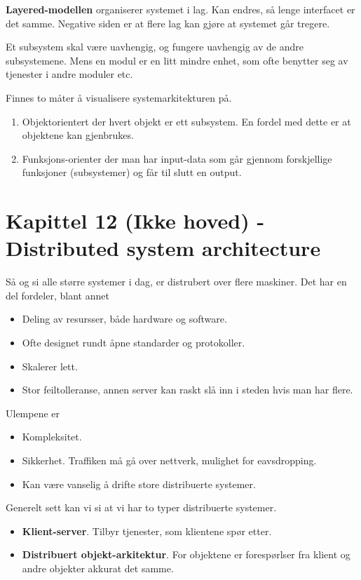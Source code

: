 \documentclass[11pt]{article}
\begin{document}
  \textbf{Layered-modellen} organiserer systemet i lag. Kan endres, så lenge interfacet er det samme. Negative siden er at flere lag kan gjøre at systemet går tregere.

  Et subsystem skal være uavhengig, og fungere uavhengig av de andre subsystemene. Mens en modul er en litt mindre enhet, som ofte benytter seg av tjenester i andre moduler etc.

  Finnes to måter å visualisere systemarkitekturen på.

\begin{enumerate}
\item Objektorientert
     der hvert objekt er ett subsystem. En fordel med dette er at objektene kan gjenbrukes.
\item Funksjons-orienter 
     der man har input-data som går gjennom forskjellige funksjoner (subsystemer) og får til slutt en output.
\end{enumerate}
\section{Kapittel 12 (Ikke hoved) - Distributed system architecture}
\label{sec-13}

  Så og si alle større systemer i dag, er distrubert over flere maskiner. Det har en del fordeler, blant annet

\begin{itemize}
\item Deling av resursser, både hardware og software.
\item Ofte designet rundt åpne standarder og protokoller.
\item Skalerer lett.
\item Stor feiltolleranse, annen server kan raskt slå inn i steden hvis man har flere.
\end{itemize}

  Ulempene er

\begin{itemize}
\item Kompleksitet.
\item Sikkerhet.
    Traffiken må gå over nettverk, mulighet for eavsdropping.
\item Kan være vanselig å drifte store distribuerte systemer.
\end{itemize}

  Generelt sett kan vi si at vi har to typer distribuerte systemer.

\begin{itemize}
\item \textbf{Klient-server}. Tilbyr tjenester, som klientene spør etter.
\item \textbf{Distribuert objekt-arkitektur}. For objektene er forespørlser fra klient og andre objekter akkurat det samme.
\end{itemize}
\end{document}
